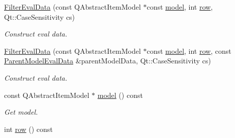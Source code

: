 \begin{DoxyCompactItemize}
\item 
\hyperlink{class_mdt_1_1_item_model_1_1_expression_1_1_filter_eval_data_af67fb49dfbf2d1289b1b7ac226489e7a}{Filter\+Eval\+Data} (const Q\+Abstract\+Item\+Model $\ast$const \hyperlink{class_mdt_1_1_item_model_1_1_expression_1_1_filter_eval_data_a5deea4d17ef26df99d6c7d8a774c74a5}{model}, int \hyperlink{class_mdt_1_1_item_model_1_1_expression_1_1_filter_eval_data_aab652da04aa23b39aba3711a61ca82b6}{row}, Qt\+::\+Case\+Sensitivity cs)
\begin{DoxyCompactList}\small\item\em Construct eval data. \end{DoxyCompactList}\item 
\hyperlink{class_mdt_1_1_item_model_1_1_expression_1_1_filter_eval_data_a721943295379ba0fa31b9fcf46edba40}{Filter\+Eval\+Data} (const Q\+Abstract\+Item\+Model $\ast$const \hyperlink{class_mdt_1_1_item_model_1_1_expression_1_1_filter_eval_data_a5deea4d17ef26df99d6c7d8a774c74a5}{model}, int \hyperlink{class_mdt_1_1_item_model_1_1_expression_1_1_filter_eval_data_aab652da04aa23b39aba3711a61ca82b6}{row}, const \hyperlink{class_mdt_1_1_item_model_1_1_expression_1_1_parent_model_eval_data}{Parent\+Model\+Eval\+Data} \&parent\+Model\+Data, Qt\+::\+Case\+Sensitivity cs)
\begin{DoxyCompactList}\small\item\em Construct eval data. \end{DoxyCompactList}\item 
const Q\+Abstract\+Item\+Model $\ast$ \hyperlink{class_mdt_1_1_item_model_1_1_expression_1_1_filter_eval_data_a5deea4d17ef26df99d6c7d8a774c74a5}{model} () const \hypertarget{class_mdt_1_1_item_model_1_1_expression_1_1_filter_eval_data_a5deea4d17ef26df99d6c7d8a774c74a5}{}\label{class_mdt_1_1_item_model_1_1_expression_1_1_filter_eval_data_a5deea4d17ef26df99d6c7d8a774c74a5}

\begin{DoxyCompactList}\small\item\em Get model. \end{DoxyCompactList}\item 
int \hyperlink{class_mdt_1_1_item_model_1_1_expression_1_1_filter_eval_data_aab652da04aa23b39aba3711a61ca82b6}{row} () const \hypertarget{class_mdt_1_1_item_model_1_1_expression_1_1_filter_eval_data_aab652da04aa23b39aba3711a61ca82b6}{}\label{class_mdt_1_1_item_model_1_1_expression_1_1_filter_eval_data_aab652da04aa23b39aba3711a61ca82b6}


\end{DoxyCompactItemize}
